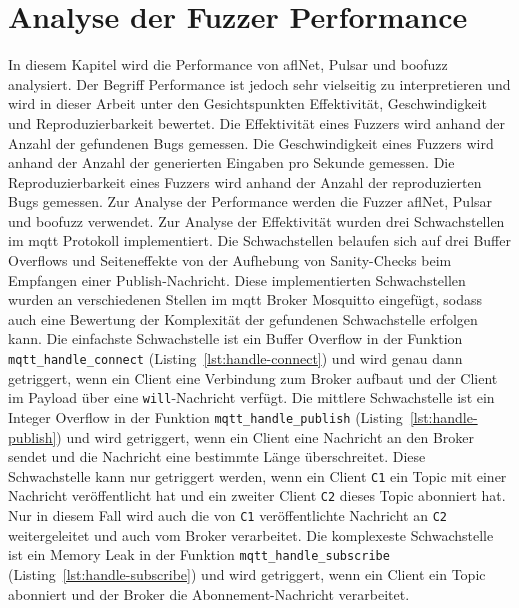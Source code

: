 
\section{Analyse der Fuzzer Performance}\label{sec:analyse-der-performance}
In diesem Kapitel wird die Performance von \gls{afl}Net, Pulsar und boofuzz analysiert.
Der Begriff Performance ist jedoch sehr vielseitig zu interpretieren und wird in dieser Arbeit unter den Gesichtspunkten
Effektivität, Geschwindigkeit und Reproduzierbarkeit bewertet.\newline
Die Effektivität eines Fuzzers wird anhand der Anzahl der gefundenen Bugs gemessen.
Die Geschwindigkeit eines Fuzzers wird anhand der Anzahl der generierten Eingaben pro Sekunde gemessen.
Die Reproduzierbarkeit eines Fuzzers wird anhand der Anzahl der reproduzierten Bugs gemessen.
Zur Analyse der Performance werden die Fuzzer \gls{afl}Net, Pulsar und boofuzz verwendet.\newline\newline
Zur Analyse der Effektivität wurden drei Schwachstellen im \gls{mqtt} Protokoll implementiert.
Die Schwachstellen belaufen sich auf drei Buffer Overflows und Seiteneffekte von der Aufhebung von Sanity-Checks beim
Empfangen einer Publish-Nachricht.
Diese implementierten Schwachstellen wurden an verschiedenen Stellen im \gls{mqtt} Broker Mosquitto eingefügt, sodass
auch eine Bewertung der Komplexität der gefundenen Schwachstelle erfolgen kann.
Die einfachste Schwachstelle ist ein Buffer Overflow in der Funktion \texttt{mqtt\_handle\_connect} (Listing~\ref{lst:handle-connect}) und wird genau dann
getriggert, wenn ein Client eine Verbindung zum Broker aufbaut und der Client im Payload über eine \texttt{will}-Nachricht
verfügt.
Die mittlere Schwachstelle ist ein Integer Overflow in der Funktion \texttt{mqtt\_handle\_publish} (Listing~\ref{lst:handle-publish}) und wird getriggert,
wenn ein Client eine Nachricht an den Broker sendet und die Nachricht eine bestimmte Länge überschreitet.
Diese Schwachstelle kann nur getriggert werden, wenn ein Client \texttt{C1} ein Topic mit einer Nachricht veröffentlicht hat und ein
zweiter Client \texttt{C2} dieses Topic abonniert hat.
Nur in diesem Fall wird auch die von \texttt{C1} veröffentlichte Nachricht an \texttt{C2} weitergeleitet und auch vom Broker verarbeitet.
Die komplexeste Schwachstelle ist ein Memory Leak in der Funktion \texttt{mqtt\_handle\_subscribe} (Listing~\ref{lst:handle-subscribe}) und wird getriggert,
wenn ein Client ein Topic abonniert und der Broker die Abonnement-Nachricht verarbeitet.



